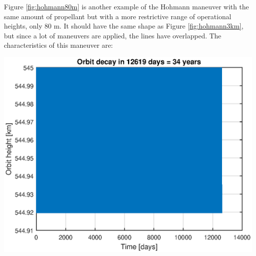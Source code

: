 Figure \ref{fig:hohmann80m} is another example of the Hohmann maneuver with the same amount of propellant but with a more restrictive range of operational heights, only 80 m. It should have the same shape as Figure \ref{fig:hohmann3km}, but since a lot of maneuvers are applied, the lines have overlapped. The characteristics of this maneuver are:

\begin{minipage}{\textwidth}
\begin{minipage}[b]{0.49\textwidth}
\centering
\includegraphics[scale=0.4]{ThrustersDrag/thrust80m.eps}
\label{fig:hohmann80m}
\end{minipage}
\hfill
{}
\end{minipage}

